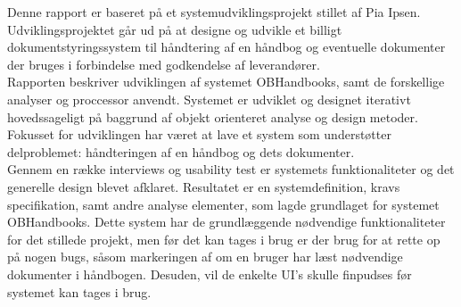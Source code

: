 Denne rapport er baseret på et systemudviklingsprojekt stillet af Pia Ipsen. 
Udviklingsprojektet går ud på at designe og udvikle et billigt dokumentstyringssystem til håndtering af en håndbog og eventuelle dokumenter der bruges i forbindelse med godkendelse af leverandører.\\

Rapporten beskriver udviklingen af systemet OBHandbooks, samt de forskellige analyser og proccessor anvendt.
Systemet er udviklet og designet iterativt hovedssageligt på baggrund af objekt orienteret analyse og design metoder.\\

Fokusset for udviklingen har været at lave et system som understøtter delproblemet: håndteringen af en håndbog og dets dokumenter.
\\
Gennem en række interviews og usability test er systemets funktionaliteter og det generelle design blevet afklaret.
Resultatet er en systemdefinition, kravs specifikation, samt andre analyse elementer, som lagde grundlaget for systemet OBHandbooks.
Dette system har de grundlæggende nødvendige funktionaliteter for det stillede projekt, men før det kan tages i brug er der brug for at rette op på nogen bugs, såsom markeringen af om en bruger har læst nødvendige dokumenter i håndbogen.
Desuden, vil de enkelte UI's skulle finpudses før systemet kan tages i brug.


